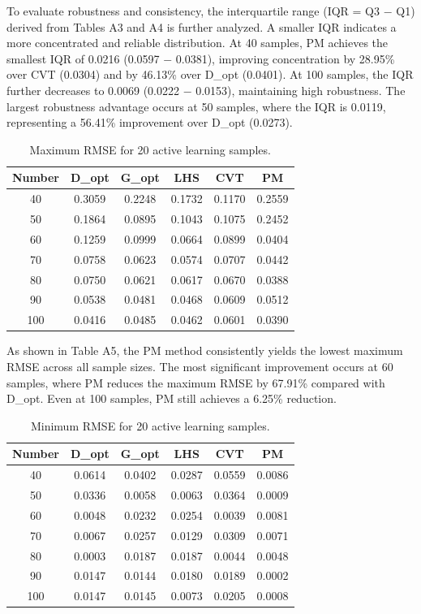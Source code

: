 \documentclass[]{interact}
\theoremstyle{plain}%
\theoremstyle{definition}
\theoremstyle{remark}
\begin{document}
To evaluate robustness and consistency, the interquartile range (IQR = Q3 $-$ Q1) derived from Tables A3 and A4 is further analyzed. A smaller IQR indicates a more concentrated and reliable distribution. At 40 samples, PM achieves the smallest IQR of 0.0216 (0.0597 $-$ 0.0381), improving concentration by 28.95\% over CVT (0.0304) and by 46.13\% over D\_opt (0.0401). At 100 samples, the IQR further decreases to 0.0069 (0.0222 $-$ 0.0153), maintaining high robustness. The largest robustness advantage occurs at 50 samples, where the IQR is 0.0119, representing a 56.41\% improvement over D\_opt (0.0273).

\begin{table}[h!]
	\centering
	\caption{Maximum RMSE for 20 active learning samples.}
	\begin{tabular}{cccccc}
		\toprule
		Number & D\_opt & G\_opt & LHS & CVT & PM \\
		\midrule
		40 & 0.3059 & 0.2248 & 0.1732 & 0.1170 & 0.2559 \\
		50 & 0.1864 & 0.0895 & 0.1043 & 0.1075 & 0.2452 \\
		60 & 0.1259 & 0.0999 & 0.0664 & 0.0899 & 0.0404 \\
		70 & 0.0758 & 0.0623 & 0.0574 & 0.0707 & 0.0442 \\
		80 & 0.0750 & 0.0621 & 0.0617 & 0.0670 & 0.0388 \\
		90 & 0.0538 & 0.0481 & 0.0468 & 0.0609 & 0.0512 \\
		100 & 0.0416 & 0.0485 & 0.0462 & 0.0601 & 0.0390 \\
		\bottomrule
	\end{tabular}
\end{table}

As shown in Table A5, the PM method consistently yields the lowest maximum RMSE across all sample sizes. The most significant improvement occurs at 60 samples, where PM reduces the maximum RMSE by 67.91\% compared with D\_opt. Even at 100 samples, PM still achieves a 6.25\% reduction.

\begin{table}[h!]
	\centering
	\caption{Minimum RMSE for 20 active learning samples.}
	\begin{tabular}{cccccc}
		\toprule
		Number & D\_opt & G\_opt & LHS & CVT & PM \\
		\midrule
		40 & 0.0614 & 0.0402 & 0.0287 & 0.0559 & 0.0086 \\
		50 & 0.0336 & 0.0058 & 0.0063 & 0.0364 & 0.0009 \\
		60 & 0.0048 & 0.0232 & 0.0254 & 0.0039 & 0.0081 \\
		70 & 0.0067 & 0.0257 & 0.0129 & 0.0309 & 0.0071 \\
		80 & 0.0003 & 0.0187 & 0.0187 & 0.0044 & 0.0048 \\
		90 & 0.0147 & 0.0144 & 0.0180 & 0.0189 & 0.0002 \\
		100 & 0.0147 & 0.0145 & 0.0073 & 0.0205 & 0.0008 \\
		\bottomrule
	\end{tabular}
\end{table}
\end{document}

